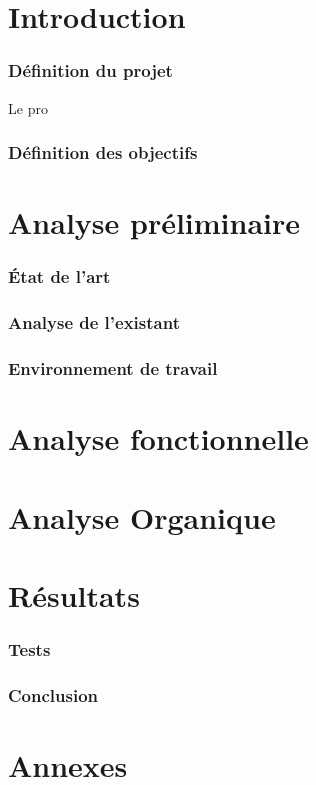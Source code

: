 \documentclass[11pt, a4paper, oneside]{article}
\begin{document}
\part{Introduction}
\section{Définition du projet}
Le pro
\section{Définition des objectifs}
\newpage
\part{Analyse préliminaire}
\section{État de l'art}
\section{Analyse de l'existant}
\section{Environnement de travail}
\newpage
\part{Analyse fonctionnelle}
\newpage
\part{Analyse Organique}
\newpage
\part{Résultats}
\section{Tests}
\section{Conclusion}
\newpage
\part{Annexes}
\end{document}
